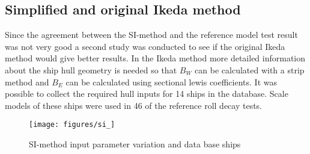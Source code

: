 \subsection{Simplified and original Ikeda method}
\label{se:si_ikeda_model}
Since the agreement between the SI-method and the reference model test result was not very good a second study was conducted to see if the original Ikeda method would give better results. In the Ikeda method more detailed information about the ship hull geometry is needed so that $B_W$ can be calculated with a strip method and $B_E$ can be calculated using sectional lewis coefficients. It was possible to collect the required hull inputs for 14 ships in the database. Scale models of these ships were used in 46 of the reference roll decay tests.

\begin{figure}[H]
    \centering
    \texttt{[image: figures/si\_]}
        \vspace{-0.5cm}
    \caption{SI-method input parameter variation and data base ships}
    \label{fig:s}
\end{figure}
